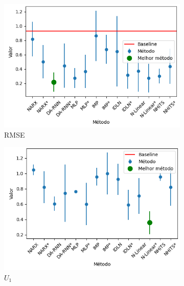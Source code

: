 \begin{figure}[htbp]
	\begin{subfigure}[b]{0.3\textwidth}
		\centering
		\includegraphics[width=\textwidth]{figuras/rmse_takens_brasil_results.png}
		\caption{\ac{RMSE}}
		\label{fig:rmse_takens_brasil_results}
	\end{subfigure}
	\hfill
	\begin{subfigure}[b]{0.3\textwidth}
		\centering
		\includegraphics[width=\textwidth]{figuras/u1_takens_brasil_results.png}
		\caption{\(U_1\)}
		\label{fig:u1_takens_brasil_results}
	\end{subfigure}
	\hfill
	\begin{subfigure}[b]{0.3\textwidth}
		\centering

\end{subfigure}
\end{figure}
